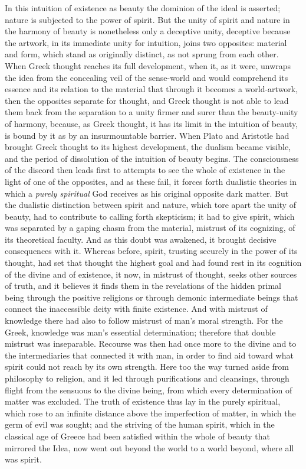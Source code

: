 \documentclass[12pt,a4paper,openany]{book}
\newcommand{\opage}[1]{\marginnote{\footnotesize\textit{[#1]}}}
\begin{document}
In this intuition of existence as beauty the dominion of the ideal
is asserted; nature is subjected to the power of spirit.
But the unity of spirit and nature in the harmony of beauty is nonetheless
only a deceptive unity, deceptive because the artwork, in its
immediate unity for intuition, joins two opposites:
material and form, which stand as originally distinct,
as not sprung from each other. When Greek thought
reaches its full development, when it, as it were, unwraps the idea
from the concealing veil of the sense-world and would comprehend its essence
and its relation to the material that through it becomes a
\opage{444}world-artwork, then the opposites separate for thought,
and Greek thought is not able to lead them back from the separation
to a unity firmer and surer than the beauty-unity
of harmony, because, as Greek thought, it has its limit
in the intuition of beauty, is bound by it as by an
insurmountable barrier. When Plato and Aristotle had brought
Greek thought to its highest development, the dualism became
visible, and the period of dissolution of the intuition of beauty begins.
The consciousness of the discord then leads first to attempts
to see the whole of existence in the light of one of the opposites,
and as these fail, it forces forth dualistic theories in
which a \emph{purely spiritual} God receives as his original
opposite dark matter. But the dualistic distinction
between spirit and nature, which tore apart the unity of beauty,
had to contribute to calling forth skepticism; it had to
give spirit, which was separated by a gaping chasm from the
material, mistrust of its cognizing, of its theoretical faculty.
And as this doubt was awakened, it brought decisive consequences with it.
Whereas before, spirit, trusting securely in the power
of its thought, had set that thought the highest goal and had found rest
in its cognition of the divine and of existence,
it now, in mistrust of thought, seeks other sources of
truth, and it believes it finds them in the revelations of the hidden primal being
through the positive religions or through
demonic intermediate beings that connect the inaccessible
deity with finite existence. And with mistrust
of knowledge there had also to follow mistrust of man's moral
strength. For the Greek, knowledge was man's essential determination;
therefore that double mistrust was inseparable.
Recourse was then had once more to the divine and to the intermediaries
that connected it with man, in order to find aid toward
what spirit could not reach by its own strength. Here too
the way turned aside from philosophy to religion, and it led
through purifications and cleansings, through flight from the
sensuous to the divine being, from which every determination
of matter was excluded. The truth of existence
\opage{445}thus lay in the purely spiritual, which rose to an infinite
distance above the imperfection of matter, in which the germ of
evil was sought; and the striving of the human spirit, which in
the classical age of Greece had been satisfied within the
whole of beauty that mirrored the Idea, now went out beyond the world
to a world beyond, where all was spirit.
\end{document}
